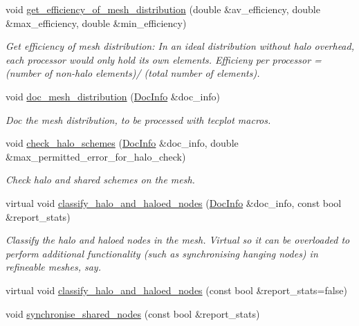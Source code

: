 \begin{DoxyCompactItemize}
void \hyperlink{classoomph_1_1Mesh_a976ee9d35c0e10786bd3bfc86dfb34b1}{get\+\_\+efficiency\+\_\+of\+\_\+mesh\+\_\+distribution} (double \&av\+\_\+efficiency, double \&max\+\_\+efficiency, double \&min\+\_\+efficiency)
\begin{DoxyCompactList}\small\item\em Get efficiency of mesh distribution\+: In an ideal distribution without halo overhead, each processor would only hold its own elements. Efficieny per processor = (number of non-\/halo elements)/ (total number of elements). \end{DoxyCompactList}\item 
void \hyperlink{classoomph_1_1Mesh_ac709c75770886514e2d38c2c7cb74f72}{doc\+\_\+mesh\+\_\+distribution} (\hyperlink{classoomph_1_1DocInfo}{Doc\+Info} \&doc\+\_\+info)
\begin{DoxyCompactList}\small\item\em Doc the mesh distribution, to be processed with tecplot macros. \end{DoxyCompactList}\item 
void \hyperlink{classoomph_1_1Mesh_a500ba96f32d090b15dbdbadcaef0e32a}{check\+\_\+halo\+\_\+schemes} (\hyperlink{classoomph_1_1DocInfo}{Doc\+Info} \&doc\+\_\+info, double \&max\+\_\+permitted\+\_\+error\+\_\+for\+\_\+halo\+\_\+check)
\begin{DoxyCompactList}\small\item\em Check halo and shared schemes on the mesh. \end{DoxyCompactList}\item 
virtual void \hyperlink{classoomph_1_1Mesh_a595cfa652d75d9fbfc72a8252fe6782e}{classify\+\_\+halo\+\_\+and\+\_\+haloed\+\_\+nodes} (\hyperlink{classoomph_1_1DocInfo}{Doc\+Info} \&doc\+\_\+info, const bool \&report\+\_\+stats)
\begin{DoxyCompactList}\small\item\em Classify the halo and haloed nodes in the mesh. Virtual so it can be overloaded to perform additional functionality (such as synchronising hanging nodes) in refineable meshes, say. \end{DoxyCompactList}\item 
virtual void \hyperlink{classoomph_1_1Mesh_af2a6ebabea8704acadffb735a2c868bb}{classify\+\_\+halo\+\_\+and\+\_\+haloed\+\_\+nodes} (const bool \&report\+\_\+stats=false)
\item 
void \hyperlink{classoomph_1_1Mesh_a5c535dac8f8de9240ecb58058a9cd5ec}{synchronise\+\_\+shared\+\_\+nodes} (const bool \&report\+\_\+stats)

\end{DoxyCompactItemize}
